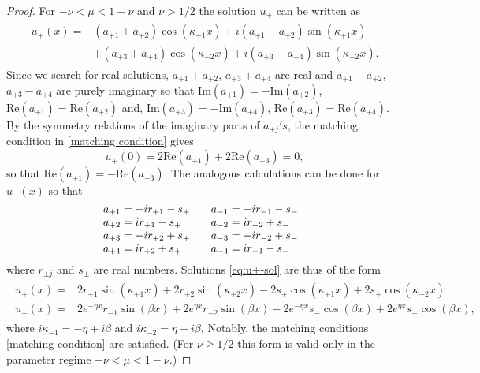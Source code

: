 \documentclass[10pt,a4paper]{amsart}
\begin{document}
		\begin{proof} 
		For $-\nu < \mu < 1-\nu$ and $\nu>1/2$ the solution $u_+$ can be written as
		\begin{align}
			\begin{split}
				u_+(x) =& (a_{+1} + a_{+2}) \cos (\kappa_{+1} x) + i ( a_{+1} - a_{+2} ) \sin (\kappa_{+1} x) \\
				&+ ( a_{+3} + a_{+4}) \cos (\kappa_{+2} x) + i ( a_{+3} - a_{+4}) \sin (\kappa_{+2} x) .
			\end{split}
		\end{align}
		Since we search for real solutions, $a_{+1} + a_{+2}$, $ a_{+3} + a_{+4}$ are real and $a_{+1} - a_{+2}$, $a_{+3} - a_{+4}$ are purely imaginary so that $\mathrm{Im}(a_{+1}) = -\mathrm{Im}(a_{+2})$, $\mathrm{Re}(a_{+1}) = \mathrm{Re}(a_{+2})$ and, $\mathrm{Im}(a_{+3}) = -\mathrm{Im}(a_{+4})$, $\mathrm{Re}(a_{+3}) = \mathrm{Re}(a_{+4})$. By the symmetry relations of the imaginary parts of $a_{\pm j}'s$, the matching condition in \eqref{matching condition} gives
		\begin{equation}
			u_+(0) = 2 \mathrm{Re} (a_{+1}) + 2 \mathrm{Re} (a_{+3}) = 0, 
		\end{equation}
		so that $\mathrm{Re}(a_{+1}) = -\mathrm{Re}(a_{+3})$.
		The analogous calculations can be done for $u_{-}(x)$  
		so that 
		\begin{equation}
			\begin{tabular}{p{0.25\linewidth} p{0.25\linewidth}}
				\parbox{\linewidth}{$a_{+1} = -i r_{+1} - s_+ $ \\ $a_{+2} = i r_{+1} - s_+ $ \\ $a_{+3} = -i r_{+2} + s_+ $ \\ $a_{+4} = i r_{+2} + s_+ $}&
				\parbox{\linewidth}{$a_{-1} = -i r_{-1} - s_- $ \\ $a_{-2} = i r_{-2} + s_- $ \\ $a_{-3} = -i r_{-2} + s_- $ \\ $a_{-4} = i r_{-1} - s_- $}
			\end{tabular}
		\end{equation}
		where $r_{\pm j}$ and $s_{\pm}$ are real numbers. Solutions \eqref{eq:u+-sol}  
		are thus of the form
		\begin{align}\label{new u's}
			\begin{split}
				u_+(x) =& 2 r_{+1} \sin(\kappa_{+1}x) + 2 r_{+2} \sin(\kappa_{+2}x)  -2 s_+ \cos(\kappa_{+1}x) + 2 s_+ \cos(\kappa_{+2}x)\\
				u_-(x) =& 2 e^{-\eta x} r_{-1} \sin(\beta x) + 2 e^{\eta x} r_{-2} \sin(\beta x) -2 e^{-\eta x} s_- \cos(\beta x) + 2 e^{\eta x} s_- \cos(\beta x),
			\end{split}
		\end{align} 
		where $i \kappa_{-1} = -\eta + i \beta$ and $i \kappa_{-2} = \eta + i \beta$. Notably, the matching conditions \eqref{matching condition} are satisfied. (For $\nu\geq 1/2$ this form is valid only in the parameter regime $-\nu < \mu < 1-\nu$.) 
		 

\end{proof}
\end{document}
